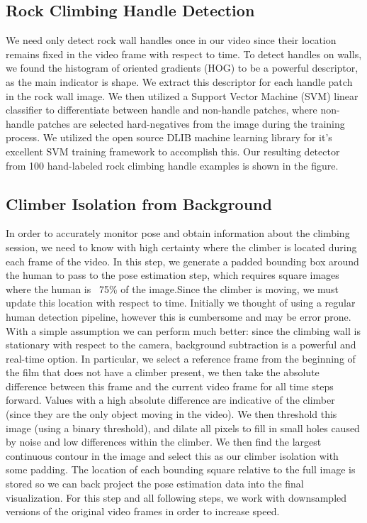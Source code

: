 \documentclass{chi2009}
\begin{document}
\subsection{Rock Climbing Handle Detection}

We need only detect rock wall handles once in our video since their location remains fixed in the video frame with respect to time. To detect handles on walls, we found the histogram of oriented gradients (HOG) to be a powerful descriptor, as the main indicator is shape. We extract this descriptor for each handle patch in the rock wall image. We then utilized a Support Vector Machine (SVM) linear classifier to differentiate between handle and non-handle patches, where non-handle patches are selected hard-negatives from the image during the training process. We utilized the open source DLIB machine learning library for it's excellent SVM training framework to accomplish this. Our resulting detector from 100 hand-labeled rock climbing handle examples is shown in the figure.

\subsection{Climber Isolation from Background}

In order to accurately monitor pose and obtain information about the climbing session, we need to know with high certainty where the climber is located during each frame of the video. In this step, we generate a padded bounding box around the human to pass to the pose estimation step, which requires square images where the human is ~75\% of the image.Since the climber is moving, we must update this location with respect to time. Initially we thought of using a regular human detection pipeline, however this is cumbersome and may be error prone. With a simple assumption we can perform much better: since the climbing wall is stationary with respect to the camera, background subtraction is a powerful and real-time option. In particular, we select a reference frame from the beginning of the film that does not have a climber present, we then take the absolute difference between this frame and the current video frame for all time steps forward. Values with a high absolute difference are indicative of the climber (since they are the only object moving in the video). We then threshold this image (using a binary threshold), and dilate all pixels to fill in small holes caused by noise and low differences within the climber. We then find the largest continuous contour in the image and select this as our climber isolation with some padding. The location of each bounding square relative to the full image is stored so we can back project the pose estimation data into the final visualization. For this step and all following steps, we work with downsampled versions of the original video frames in order to increase speed.
\end{document}
